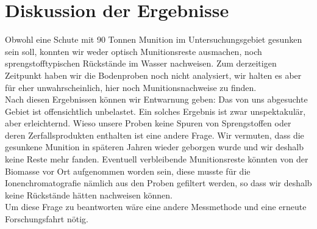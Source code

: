 \section{Diskussion der Ergebnisse}
Obwohl eine Schute mit 90 Tonnen Munition im Untersuchungsgebiet gesunken sein soll\cite{schiffsschicksale}, konnten wir weder optisch Munitionsreste ausmachen, noch sprengstofftypischen Rückstände im Wasser nachweisen. Zum derzeitigen Zeitpunkt haben wir die Bodenproben noch nicht analysiert, wir halten es aber für eher unwahrscheinlich, hier noch Munitionsnachweise zu finden.
\\
Nach diesen Ergebnissen können wir Entwarnung geben: Das von uns abgesuchte Gebiet ist offensichtlich unbelastet. Ein solches Ergebnis ist zwar unspektakulär, aber erleichternd. Wieso 
unsere Proben keine Spuren von Sprengstoffen oder deren Zerfallsprodukten 
enthalten ist eine andere Frage. Wir vermuten, dass die gesunkene Munition in späteren Jahren wieder geborgen wurde und wir deshalb keine Reste mehr fanden.
Eventuell verbleibende Munitionsreste könnten von der Biomasse vor Ort aufgenommen worden sein, diese musste für die Ionenchromatografie nämlich aus den Proben gefiltert werden, so dass wir deshalb keine Rückstände hätten nachweisen können. \\ 
Um diese Frage zu beantworten wäre eine andere Messmethode und eine erneute Forschungsfahrt nötig.